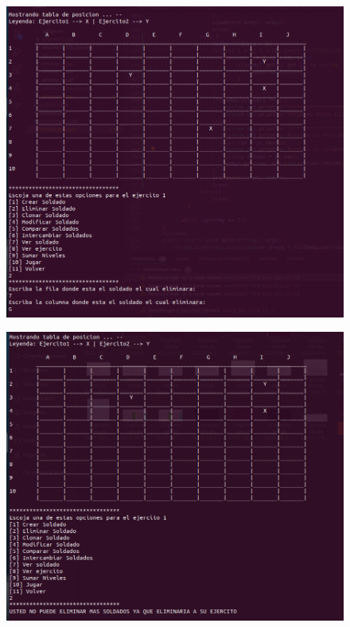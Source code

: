 \documentclass{article}
\begin{document}
	\begin{figure}[H]
		\centering
		\includegraphics[width=1.0\textwidth,keepaspectratio]{img/Commit5.png}
	\end{figure}
	\begin{figure}[H]
		\centering
		\includegraphics[width=1.0\textwidth,keepaspectratio]{img/Commit5.1.png}
	\end{figure}
\end{document}
